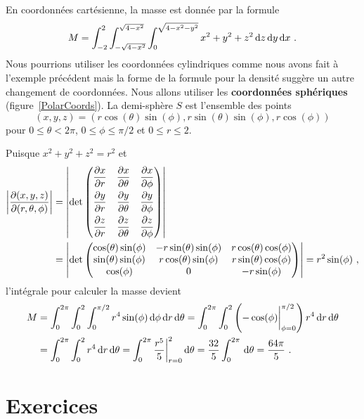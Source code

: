 {\begin{egg}
En coordonnées cartésienne, la masse est donnée par la formule
\[
  M = \int_{-2}^2 \int_{-\sqrt{4-x^2}}^{\sqrt{4-x^2}}
  \int_0^{\sqrt{4-x^2-y^2}} x^2 + y^2 + z^2 \dx{z} \dx{y} \dx{x} \ .
\]
Nous pourrions utiliser les coordonnées cylindriques comme nous avons
fait à l'exemple précédent mais la forme de la formule pour la densité
suggère un autre changement de coordonnées.   Nous allons
utiliser les {\bfseries coordonnées sphériques} (figure~\ref{PolarCoords}).
La demi-sphère $S$ est l'ensemble des points
\[
  (x,y,z) = (r \cos(\theta)\sin(\phi), r\sin(\theta)\sin(\phi),r \cos(\phi))
\]
pour
$0 \leq \theta < 2\pi$, $0 \leq \phi \leq \pi/2$ et $0 \leq r \leq 2$.

Puisque $x^2 + y^2 + z^2 = r^2$ et
\begin{align*}
\left| \frac{\partial(x,y,z)}{\partial(r,\theta,\phi)} \right| &= 
\left| \det \begin{pmatrix}
\displaystyle \frac{\partial x}{\partial r} & \displaystyle \frac{\partial x}{\partial \theta}
& \displaystyle \frac{\partial x}{\partial \phi} \\[0.8em]
\displaystyle \frac{\partial y}{\partial r} & \displaystyle \frac{\partial y}{\partial \theta}
& \displaystyle \frac{\partial y}{\partial \phi} \\[0.8em]
\displaystyle \frac{\partial z}{\partial r} & \displaystyle \frac{\partial z}{\partial \theta}
& \displaystyle \frac{\partial z}{\partial \phi}
\end{pmatrix} \right| \\
&= \left| \det \begin{pmatrix}
\cos(\theta)\sin(\phi) & -r \sin(\theta)\sin(\phi) &
  r\cos(\theta)\cos(\phi) \\
\sin(\theta)\sin(\phi) & r \cos(\theta)\sin(\phi) &
 r\sin(\theta)\cos(\phi) \\
\cos(\phi) & 0 & -r\sin(\phi)
\end{pmatrix} \right|
= r^2 \sin(\phi) \ ,
\end{align*}
l'intégrale pour calculer la masse devient
\begin{align*}
M &= \int_0^{2\pi} \int_0^2 \int_0^{\pi/2}  r^4 \sin(\phi) \,\mathrm{d}\phi
\,\mathrm{d}r \,\mathrm{d}\theta
= \int_0^{2\pi} \int_0^2
\left(-\cos(\phi) \bigg|_{\phi=0}^{\pi/2}\right) r^4 \,\mathrm{d}r \,\mathrm{d}\theta \\
& = \int_0^{2\pi} \int_0^2 r^4 \,\mathrm{d}r \,\mathrm{d}\theta
= \int_0^{2\pi} \frac{r^5}{5}\bigg|_{r=0}^{2} \,\mathrm{d}\theta
= \frac{32}{5} \int_0^{2\pi} \,\mathrm{d}\theta = \frac{64\pi}{5} \ .
\end{align*}
\end{egg}

}  %

\section{Exercices}

